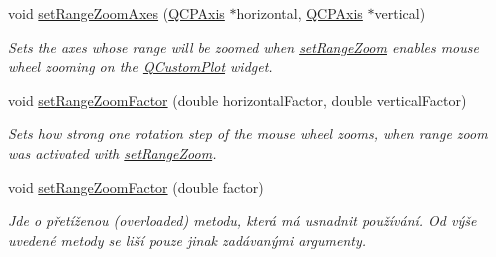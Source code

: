 \begin{DoxyCompactItemize}
void \hyperlink{classQCPAxisRect_a9442cca2aa358405f39a64d51eca13d2}{set\+Range\+Zoom\+Axes} (\hyperlink{classQCPAxis}{Q\+C\+P\+Axis} $\ast$horizontal, \hyperlink{classQCPAxis}{Q\+C\+P\+Axis} $\ast$vertical)
\begin{DoxyCompactList}\small\item\em Sets the axes whose range will be zoomed when \hyperlink{classQCPAxisRect_a7960a9d222f1c31d558b064b60f86a31}{set\+Range\+Zoom} enables mouse wheel zooming on the \hyperlink{classQCustomPlot}{Q\+Custom\+Plot} widget. \end{DoxyCompactList}\item 
void \hyperlink{classQCPAxisRect_a895d7ac745ea614e04056244b3c138ac}{set\+Range\+Zoom\+Factor} (double horizontal\+Factor, double vertical\+Factor)
\begin{DoxyCompactList}\small\item\em Sets how strong one rotation step of the mouse wheel zooms, when range zoom was activated with \hyperlink{classQCPAxisRect_a7960a9d222f1c31d558b064b60f86a31}{set\+Range\+Zoom}. \end{DoxyCompactList}\item 
\hypertarget{classQCPAxisRect_ae83d187b03fc6fa4f00765ad50cd3fc3}{}void \hyperlink{classQCPAxisRect_ae83d187b03fc6fa4f00765ad50cd3fc3}{set\+Range\+Zoom\+Factor} (double factor)\label{classQCPAxisRect_ae83d187b03fc6fa4f00765ad50cd3fc3}

\begin{DoxyCompactList}\small\item\em Jde o přetíženou (overloaded) metodu, která má usnadnit používání. Od výše uvedené metody se liší pouze jinak zadávanými argumenty.


\end{DoxyCompactList}
\end{DoxyCompactItemize}
